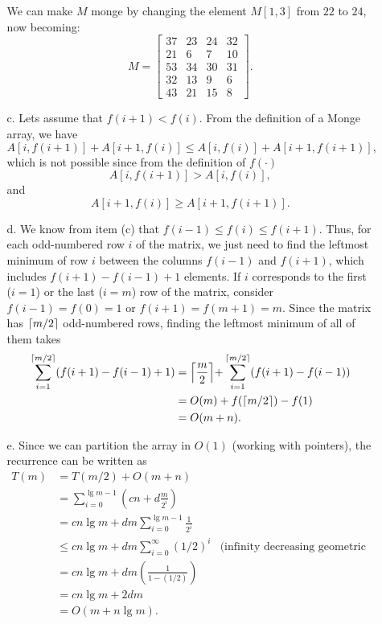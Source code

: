\begin{enumerate}
\begin{framed}
\begin{enumerate}
    We can make $M$ monge by changing the element $M[1, 3]$ from $22$ to $24$,
    now becoming:
      \[
      M =
      \begin{bmatrix}
      37 & 23 & 24 & 32\\
      21 & 6  & 7  & 10\\
      53 & 34 & 30 & 31\\
      32 & 13 & 9  & 6\\
      43 & 21 & 15 & 8
      \end{bmatrix}
      .\]
    \item[c.] Lets assume that $f(i + 1) < f(i)$. From the definition of a Monge
      array, we have
      \[
        A[i, f(i + 1)] + A[i + 1, f(i)] \le A[i, f(i)] + A[i + 1, f(i + 1)],
      \]
      which is not possible since from the definition of $f(\cdot)$
      \[
        A[i, f(i + 1)] > A[i, f(i)],
      \]
      and
      \[
        A[i + 1, f(i)] \ge A[i + 1, f(i + 1)].
      \]
    \item[d.] We know from item (c) that $f(i - 1) \le f(i) \le f(i + 1)$. Thus,
      for each odd-numbered row $i$ of the matrix, we just need to find the
      leftmost minimum of row $i$ between the columns $f(i - 1)$ and $f(i + 1)$,
      which includes $f(i + 1) - f(i - 1) + 1$ elements. If $i$ corresponds to
      the first ($i = 1$) or the last ($i = m$) row of the matrix, consider
      $f(i - 1) = f(0) = 1$ or $f(i + 1) = f(m + 1) = m$. Since the matrix has
      $\lceil m / 2\rceil$ odd-numbered rows, finding the leftmost minimum of all of
      them takes
      \begin{equation*}
      \begin{aligned}
        \sum_{i = 1}^{\lceil m/2\rceil} (f(i + 1) - f(i - 1) + 1)
        &= \Bigl\lceil{\frac{m}{2}}\Bigl\rceil + \sum_{i = 1}^{\lceil m/2\rceil} (f(i + 1) - f(i - 1))\\
        &= O(m) + f(\lceil m/2\rceil) - f(1)\\
        &= O(m + n).
      \end{aligned}
      \end{equation*}
    \item[e.]
      Since we can partition the array in $O(1)$ (working with pointers), the
      recurrence can be written as
      \begin{equation*}
      \begin{aligned}
        T(m) &= T(m/2) + O(m + n)\\
             &= \sum_{i = 0}^{\lg m - 1} \left(cn + d \frac{m}{2^i}\right)\\
             &= cn \lg m + dm \sum_{i = 0}^{\lg m - 1} \frac{1}{2^i}\\
             &\le cn \lg m + dm \sum_{i = 0}^{\infty} (1/2)^i & \text{(infinity decreasing geometric series)}\\
             &= cn \lg m + dm \left(\frac{1}{1 - (1/2)}\right)\\
             &= cn \lg m + 2dm\\
             &= O(m + n \lg m).
      \end{aligned}
      \end{equation*}
  \end{enumerate}


\end{framed}
\end{enumerate}
